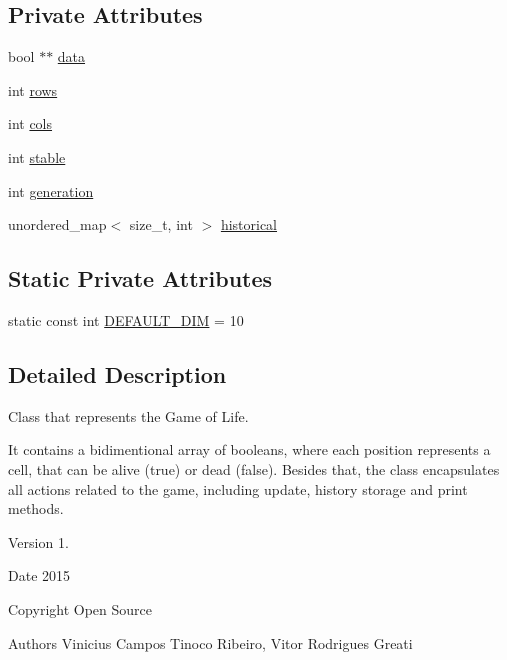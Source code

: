 \subsection*{Private Attributes}
\begin{DoxyCompactItemize}
\item 
bool $\ast$$\ast$ \hyperlink{classField_a887a35d633c25fb24bb5a1d77b5e129c}{data}
\item 
int \hyperlink{classField_a2a605fd2464725d8bd67b7cd4adfeb38}{rows}
\item 
int \hyperlink{classField_a61aa18e6c351c3d70bc815056ef81751}{cols}
\item 
int \hyperlink{classField_a7ffef1a2d4f61e0d7bc628a6183530e1}{stable}
\item 
int \hyperlink{classField_abf1358100ec5a7746c0467f25db50eac}{generation}
\item 
unordered\+\_\+map$<$ size\+\_\+t, int $>$ \hyperlink{classField_aef4dbb5a7a3eceee6a2fff882ab787df}{historical}
\end{DoxyCompactItemize}
\subsection*{Static Private Attributes}
\begin{DoxyCompactItemize}
\item 
static const int \hyperlink{classField_add3cd7850a250739b0eb08caf41427da}{D\+E\+F\+A\+U\+L\+T\+\_\+\+D\+IM} = 10
\end{DoxyCompactItemize}


\subsection{Detailed Description}
Class that represents the Game of Life. 

It contains a bidimentional array of booleans, where each position represents a cell, that can be alive (true) or dead (false). Besides that, the class encapsulates all actions related to the game, including update, history storage and print methods. \begin{DoxyVersion}{Version}
1. 
\end{DoxyVersion}
\begin{DoxyDate}{Date}
2015 
\end{DoxyDate}
\begin{DoxyCopyright}{Copyright}
Open Source 
\end{DoxyCopyright}
\begin{DoxyAuthor}{Authors}
Vinicius Campos Tinoco Ribeiro, Vitor Rodrigues Greati 
\end{DoxyAuthor}


